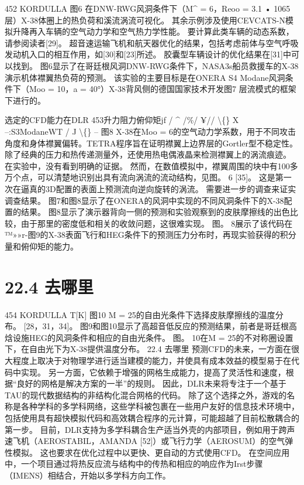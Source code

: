 \documentclass[UTF8,11pt,a4paper,openany,fontset=fandol]{ctexbook}
\begin{document}
452 KORDULLA 图6 在DNW-RWG风洞条件下（M\textasciicircum{} = 6，Reoo = 3.1 • 1065层）X-38体圈上的热负荷和溪流涡流可视化。 其余示例涉及使用CEVCATS-N模拟升降再入车辆的空气动力学和空气热力学性能。 要计算此类车辆的动态系数，请参阅读者[29]。 超音速运输飞机和航天器优化的结果，包括考虑前体与空气呼吸发动机入口的相互作用，如[30]和[23]所述。 胶囊型车辆设计的优化结果在[31]中可以找到。 图6显示了在哥廷根风洞DNW-RWG条件下，NASA3s船员救援车的X-38演示机体襟翼热负荷的预测。 该实验的主要目标是在ONERA S4 Modane风洞条件下（Moo = 10，a = 40°）X-38背风侧的德国国家技术开发图7 层流模式的框架下进行的。

选定的CFD能力在DLR 453升力阻力俯仰矩jf / \textasciicircum{} /\%/ ¥// \textbackslash\{\} X --:S3ModaneWT / J \textbackslash\{\} -- 图8 X-38在Moo = 6的空气动力学系数，用于不同攻击角度和身体襟翼偏转。TETRA程序旨在证明襟翼上边界层的Gortler型不稳定性。 除了经典的压力和热传递测量外，还使用热电偶液晶来检测襟翼上的涡流痕迹。 在实验中，没有看到明确的证据。 然而，在数值模拟中，襟翼周围的块中有100多万个点，可以清楚地识别出具有流向涡流的流动结构，见图。 6 [35]。 这是第一次在逼真的3D配置的表面上预测流向逆向旋转的涡流。 需要进一步的调查来证实调查结果。 图7和图8显示了在ONERA的风洞中实现的不同风洞条件下的X-38配置的结果。 图8显示了演示器背向一侧的预测和实验观察到的皮肤摩擦线的出色比较，由于那里的密度低和相关的收敛问题，这很难实现。 图。 8展示了该代码在™»»r-图9的X-38表面飞行和HEG条件下的预测压力分布时，再现实验获得的积分量和俯仰矩的能力。

\section{22.4 去哪里}
454 KORDULLA T[K] 图10 M = 25的自由光条件下选择皮肤摩擦线的温度分布。 [28，31，34]。 图9和图10显示了高超音低反应的预测结果，前者是哥廷根高焓设施HEG的风洞条件和相应的自由光条件。 图。 10在M = 25的不对称圈设置下，在自由光下为X-38提供温度分布。 22.4 去哪里 预测CFD的未来，一方面在很大程度上取决于对物理学进行适当建模的能力，并使具有成本效益的模型易于在代码中实现。 另一方面，它依赖于增强的网格生成能力，提高了灵活性和速度，根据“良好的网格是解决方案的一半”的规则。 因此，DLR未来将专注于一个基于TAU的现代数据结构的非结构化混合网格的代码。 除了这个选择之外，游戏的名称是各种学科的多学科网络，这些学科被包裹在一些用户友好的信息技术环境中，包括使用具有超快模拟代码和高效耦合程序的元计算，可能超越了目前松散耦合的第一步。 目前，DLR支持为多学科耦合生产适当外壳的内部项目，例如用于跨声速飞机（AEROSTABIL，AMANDA [52]）或飞行力学（AEROSUM）的空气弹性模拟。 这也要求在优化过程中以更快、更自动的方式使用CFD。 在空间应用中，一个项目通过将热反应流与结构中的传热和相应的响应作为Irst步骤（IMENS）相结合，开始以多学科方向工作。
\end{document}
